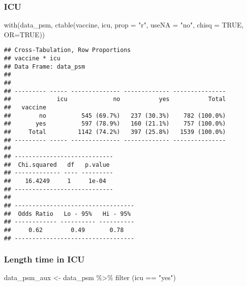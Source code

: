 \documentclass[
]{article}
\newenvironment{Shaded}{\begin{snugshade}}{\end{snugshade}}
\newcommand{\AttributeTok}[1]{\textcolor[rgb]{0.77,0.63,0.00}{#1}}
\newcommand{\ConstantTok}[1]{\textcolor[rgb]{0.00,0.00,0.00}{#1}}
\newcommand{\FunctionTok}[1]{\textcolor[rgb]{0.00,0.00,0.00}{#1}}
\newcommand{\NormalTok}[1]{#1}
\newcommand{\OtherTok}[1]{\textcolor[rgb]{0.56,0.35,0.01}{#1}}
\newcommand{\SpecialCharTok}[1]{\textcolor[rgb]{0.00,0.00,0.00}{#1}}
\newcommand{\StringTok}[1]{\textcolor[rgb]{0.31,0.60,0.02}{#1}}
\begin{document}
\hypertarget{icu-1}{%
\subsubsection{ICU}\label{icu-1}}

\begin{Shaded}
\begin{Highlighting}[]
\FunctionTok{with}\NormalTok{(data\_psm, }\FunctionTok{ctable}\NormalTok{(vaccine, icu, }\AttributeTok{prop =} \StringTok{"r"}\NormalTok{, }\AttributeTok{useNA =} \StringTok{"no"}\NormalTok{, }\AttributeTok{chisq =} \ConstantTok{TRUE}\NormalTok{, }\AttributeTok{OR=}\ConstantTok{TRUE}\NormalTok{))}
\end{Highlighting}
\end{Shaded}

\begin{verbatim}
## Cross-Tabulation, Row Proportions  
## vaccine * icu  
## Data Frame: data_psm  
## 
## 
## --------- ----- -------------- ------------- ---------------
##             icu             no           yes           Total
##   vaccine                                                   
##        no          545 (69.7%)   237 (30.3%)    782 (100.0%)
##       yes          597 (78.9%)   160 (21.1%)    757 (100.0%)
##     Total         1142 (74.2%)   397 (25.8%)   1539 (100.0%)
## --------- ----- -------------- ------------- ---------------
## 
## ----------------------------
##  Chi.squared   df   p.value 
## ------------- ---- ---------
##    16.4249     1     1e-04  
## ----------------------------
## 
## ----------------------------------
##  Odds Ratio   Lo - 95%   Hi - 95% 
## ------------ ---------- ----------
##     0.62        0.49       0.78   
## ----------------------------------
\end{verbatim}

\hypertarget{length-time-in-icu-1}{%
\subsubsection{Length time in ICU}\label{length-time-in-icu-1}}

\begin{Shaded}
\begin{Highlighting}[]
\NormalTok{data\_psm\_aux }\OtherTok{\textless{}{-}}\NormalTok{ data\_psm }\SpecialCharTok{\%\textgreater{}\%} 
  \FunctionTok{filter}\NormalTok{ (icu }\SpecialCharTok{==} \StringTok{"yes"}\NormalTok{)}
\end{Highlighting}
\end{Shaded}
\end{document}
